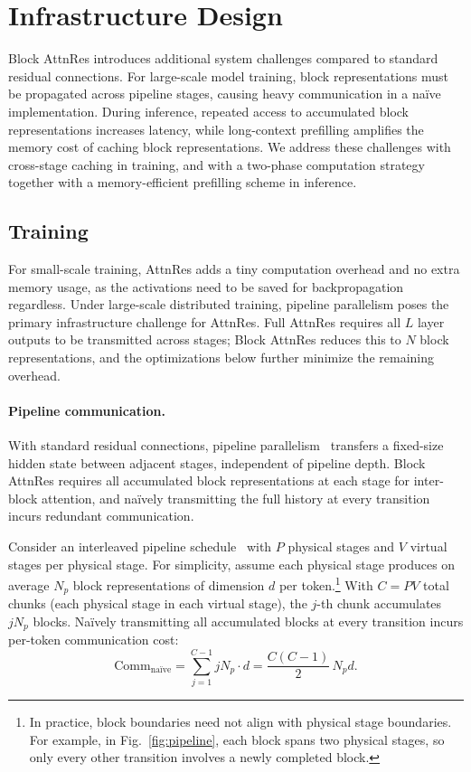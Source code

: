 \section{Infrastructure Design}
\label{sec:infra}

Block AttnRes introduces additional system challenges compared to standard residual connections. For large-scale model training, block representations must be propagated across pipeline stages, causing heavy communication in a na\"ive implementation. During inference, repeated access to accumulated block representations increases latency, while long-context prefilling amplifies the memory cost of caching block representations. We address these challenges with cross-stage caching in training, and with a two-phase computation strategy together with a memory-efficient prefilling scheme in inference.

\subsection{Training}
\label{sec:infra-training}
For small-scale training, AttnRes adds a tiny computation overhead and no extra memory usage, as the activations need to be saved for backpropagation regardless.
Under large-scale distributed training, pipeline parallelism poses the primary infrastructure challenge for AttnRes.
Full AttnRes requires all $L$ layer outputs to be transmitted across stages; Block AttnRes reduces this to $N$ block representations, and the optimizations below further minimize the remaining overhead.

\paragraph{Pipeline communication.}
With standard residual connections, pipeline parallelism~\citep{huang2019gpipe} transfers a fixed-size hidden state between adjacent stages, independent of pipeline depth.
Block AttnRes requires all accumulated block representations at each stage for inter-block attention, and na\"ively transmitting the full history at every transition incurs redundant communication.

Consider an interleaved pipeline schedule~\citep{narayanan2021megatron} with $P$ physical stages and $V$ virtual stages per physical stage.
For simplicity, assume each physical stage produces on average $N_p$ block representations of dimension $d$ per token.\footnote{In practice, block boundaries need not align with physical stage boundaries. For example, in Fig.~\ref{fig:pipeline}, each block spans two physical stages, so only every other transition involves a newly completed block.}
With $C = PV$ total chunks (each physical stage in each virtual stage), the $j$-th chunk accumulates $jN_p$ blocks.
Na\"ively transmitting all accumulated blocks at every transition incurs per-token communication cost:
\begin{equation}
    \mathrm{Comm}_{\text{na\"ive}} = \sum_{j=1}^{C-1} jN_p \cdot d = \frac{C(C{-}1)}{2}\,N_p d.
\end{equation}
